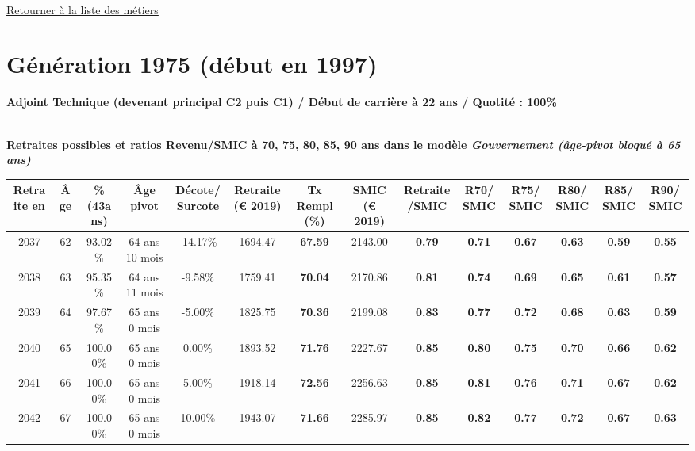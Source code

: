 ~\\ 
 
 \hyperlink{page.2}{\noindent Retourner à la liste des métiers}

 \newpage 

\section{Génération 1975 (début en 1997)\label{AdjTech_100_1975_22_0}} 
 
{\bf \noindent Adjoint Technique (devenant principal C2 puis C1) / Début de carrière à 22 ans / Quotité : 100\%}  ~ 

 ~\\{\bf \noindent Retraites possibles et ratios Revenu/SMIC à 70, 75, 80, 85, 90 ans dans le modèle \emph{Gouvernement (âge-pivot bloqué à 65 ans)}}  
 
\begin{adjustbox}{max width=\textwidth} 
\begin{tabular}[htb]{|c|c||c|c|c||c|c||c|c||c|c|c|c|c|} 
\hline 
 Retraite en &  Âge &  \%(43ans) &  Âge pivot &  Décote/Surcote &  Retraite (\euro{} 2019) &  Tx Rempl(\%) &  SMIC (\euro{} 2019) &  Retraite/SMIC &  R70/SMIC &  R75/SMIC &  R80/SMIC &  R85/SMIC &  R90/SMIC \\ 
\hline \hline 
 2037 &  62 &  93.02\% &  64 ans 10 mois &  -14.17\% &  1694.47 &  {\bf 67.59} &  2143.00 &  {\bf {\color{red} 0.79}} &  {\bf {\color{red} 0.71}} &  {\bf {\color{red} 0.67}} &  {\bf {\color{red} 0.63}} &  {\bf {\color{red} 0.59}} &  {\bf {\color{red} 0.55}} \\ 
\hline 
 2038 &  63 &  95.35\% &  64 ans 11 mois &  -9.58\% &  1759.41 &  {\bf 70.04} &  2170.86 &  {\bf {\color{red} 0.81}} &  {\bf {\color{red} 0.74}} &  {\bf {\color{red} 0.69}} &  {\bf {\color{red} 0.65}} &  {\bf {\color{red} 0.61}} &  {\bf {\color{red} 0.57}} \\ 
\hline 
 2039 &  64 &  97.67\% &  65 ans 0 mois &  -5.00\% &  1825.75 &  {\bf 70.36} &  2199.08 &  {\bf {\color{red} 0.83}} &  {\bf {\color{red} 0.77}} &  {\bf {\color{red} 0.72}} &  {\bf {\color{red} 0.68}} &  {\bf {\color{red} 0.63}} &  {\bf {\color{red} 0.59}} \\ 
\hline 
 2040 &  65 &  100.00\% &  65 ans 0 mois &  0.00\% &  1893.52 &  {\bf 71.76} &  2227.67 &  {\bf {\color{red} 0.85}} &  {\bf {\color{red} 0.80}} &  {\bf {\color{red} 0.75}} &  {\bf {\color{red} 0.70}} &  {\bf {\color{red} 0.66}} &  {\bf {\color{red} 0.62}} \\ 
\hline 
 2041 &  66 &  100.00\% &  65 ans 0 mois &  5.00\% &  1918.14 &  {\bf 72.56} &  2256.63 &  {\bf {\color{red} 0.85}} &  {\bf {\color{red} 0.81}} &  {\bf {\color{red} 0.76}} &  {\bf {\color{red} 0.71}} &  {\bf {\color{red} 0.67}} &  {\bf {\color{red} 0.62}} \\ 
\hline 
 2042 &  67 &  100.00\% &  65 ans 0 mois &  10.00\% &  1943.07 &  {\bf 71.66} &  2285.97 &  {\bf {\color{red} 0.85}} &  {\bf {\color{red} 0.82}} &  {\bf {\color{red} 0.77}} &  {\bf {\color{red} 0.72}} &  {\bf {\color{red} 0.67}} &  {\bf {\color{red} 0.63}} \\ 
\hline 
\hline 
\end{tabular} 
\end{adjustbox} 
 
